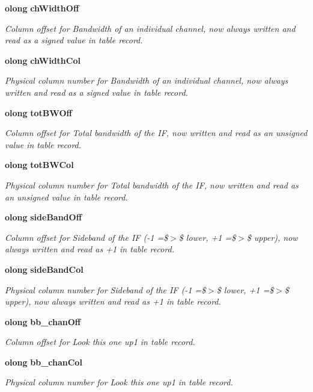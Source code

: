 \begin{CompactItemize}
{\bf olong} {\bf ch\-Width\-Off}
\begin{CompactList}\small\item\em Column offset for Bandwidth of an individual channel, now always written and read as a signed value in table record. \item\end{CompactList}\item 
{\bf olong} {\bf ch\-Width\-Col}
\begin{CompactList}\small\item\em Physical column number for Bandwidth of an individual channel, now always written and read as a signed value in table record. \item\end{CompactList}\item 
{\bf olong} {\bf tot\-BWOff}
\begin{CompactList}\small\item\em Column offset for Total bandwidth of the IF, now written and read as an unsigned value in table record. \item\end{CompactList}\item 
{\bf olong} {\bf tot\-BWCol}
\begin{CompactList}\small\item\em Physical column number for Total bandwidth of the IF, now written and read as an unsigned value in table record. \item\end{CompactList}\item 
{\bf olong} {\bf side\-Band\-Off}
\begin{CompactList}\small\item\em Column offset for Sideband of the IF (-1 =\$$>$\$ lower, +1 =\$$>$\$ upper), now always written and read as +1 in table record. \item\end{CompactList}\item 
{\bf olong} {\bf side\-Band\-Col}
\begin{CompactList}\small\item\em Physical column number for Sideband of the IF (-1 =\$$>$\$ lower, +1 =\$$>$\$ upper), now always written and read as +1 in table record. \item\end{CompactList}\item 
{\bf olong} {\bf bb\_\-chan\-Off}
\begin{CompactList}\small\item\em Column offset for Look this one up1 in table record. \item\end{CompactList}\item 
{\bf olong} {\bf bb\_\-chan\-Col}
\begin{CompactList}\small\item\em Physical column number for Look this one up1 in table record. \item\end{CompactList}\end{CompactItemize}


